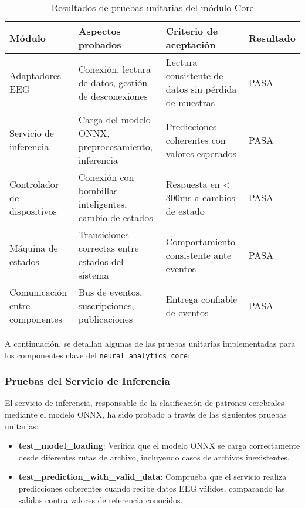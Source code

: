 \begin{table}[ht]
    \centering
    \begin{tabular}{|p{2.5cm}|p{5cm}|p{3cm}|p{2cm}|}
        \hline
        \textbf{Módulo} & \textbf{Aspectos probados} & \textbf{Criterio de aceptación} & \textbf{Resultado} \\
        \hline
        Adaptadores EEG & Conexión, lectura de datos, gestión de desconexiones & Lectura consistente de datos sin pérdida de muestras & PASA \\
        \hline
        Servicio de inferencia & Carga del modelo ONNX, preprocesamiento, inferencia & Predicciones coherentes con valores esperados & PASA \\
        \hline
        Controlador de dispositivos & Conexión con bombillas inteligentes, cambio de estados & Respuesta en < 300ms a cambios de estado & PASA \\
        \hline
        Máquina de estados & Transiciones correctas entre estados del sistema & Comportamiento consistente ante eventos & PASA \\
        \hline
        Comunicación entre componentes & Bus de eventos, suscripciones, publicaciones & Entrega confiable de eventos & PASA \\
        \hline
    \end{tabular}
    \caption{Resultados de pruebas unitarias del módulo Core}
    \label{tab:unit_tests_core}
    
A continuación, se detallan algunas de las pruebas unitarias implementadas para los componentes clave del \texttt{neural\_analytics\_core}:

\subsubsection{Pruebas del Servicio de Inferencia}

El servicio de inferencia, responsable de la clasificación de patrones cerebrales mediante el modelo ONNX, ha sido probado a través de las siguientes pruebas unitarias:

\begin{itemize}
    \item \textbf{test\_model\_loading}: Verifica que el modelo ONNX se carga correctamente desde diferentes rutas de archivo, incluyendo casos de archivos inexistentes.
    
    \item \textbf{test\_prediction\_with\_valid\_data}: Comprueba que el servicio realiza predicciones coherentes cuando recibe datos EEG válidos, comparando las salidas contra valores de referencia conocidos.
    

\end{itemize}
\end{table}
